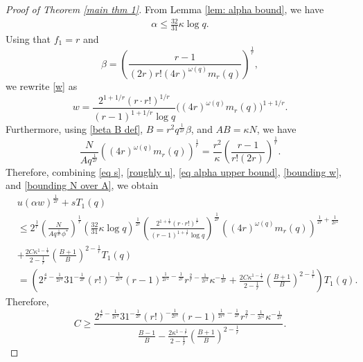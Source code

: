 \documentclass[12pt]{amsart}
\theoremstyle{plain}
\theoremstyle{definition}
\begin{document}
\begin{proof}[Proof of Theorem \ref{main thm 1}]
From Lemma \ref{lem: alpha bound}, we have
\begin{align}\label{eq alpha upper bound}
\alpha \le \frac{32}{31}\kappa \log{q}.    
\end{align}
Using that $f_1 = r$ and \begin{equation}\label{beta B def}\beta = \left(\frac{r-1}{(2r)r!(4r)^{\omega(q)}m_r(q)}\right)^{\frac{1}{r}},
\end{equation}
we rewrite \eqref{w} as
\begin{equation}\label{bounding w}
    w = \frac{2^{1+1/r}(r\cdot r!)^{1/r}}{(r-1)^{1+1/r}\log q} \bigl(\left(4r\right)^{\omega(q)}m_r(q)\bigr)^{1+1/r}.
\end{equation}
Furthermore, using \eqref{beta B def}, $B = r^2q^{\frac{1}{2r}}\beta$, and $AB = \kappa N$, we have
\begin{equation}\label{bounding N over A}
\frac{N}{A q^{\frac{1}{2r}}}\left((4r)^{\omega(q)}m_r(q)\right)^{\frac{1}{r}} = \frac{r^2}{\kappa}\left(\frac{r-1}{r!(2r)}\right)^{\frac{1}{r}}.
\end{equation}
Therefore, combining \eqref{eq s}, \eqref{roughly u}, \eqref{eq alpha upper bound}, \eqref{bounding w}, and \eqref{bounding N over A},  we obtain
\begin{align*}
    &u(\alpha w)^{\frac{1}{2r}}+sT_1(q)\\ 
    &\le 2^{\frac{1}{r}}\left(\frac{N}{Aq^{\frac{1}{2r}}\phi^*}\right)^{\frac{1}{r}}\left(\frac{32}{31}\kappa \log{q}\right)^{\frac{1}{2r}}\left(\frac{2^{1+\frac{1}{r}}(r\cdot r!)^{\frac{1}{r}}}{(r-1)^{1+\frac{1}{r}}\log{q}}\right)^{\frac{1}{2r}}\left((4r)^{\omega(q)}m_r(q)\right)^{\frac{1}{2r}+\frac{1}{2r^2}}\\ &+\frac{2C\kappa^{1-\frac{1}{r}}}{2-\frac{1}{r}}\left(\frac{B+1}{B}\right)^{2-\frac{1}{r}}T_1(q)\\
    &= \left(2^{\frac{4}{r}-\frac{1}{2r^2}}31^{-\frac{1}{2r}}(r!)^{-\frac{1}{2r^2}}(r-1)^{\frac{1}{2r^2}-\frac{1}{2r}}r^{\frac{2}{r}-\frac{1}{2r^2}}\kappa^{-\frac{1}{2r}} +\frac{2C\kappa^{1-\frac{1}{r}}}{2-\frac{1}{r}}\left(\frac{B+1}{B}\right)^{2-\frac{1}{r}}\right)T_1(q).
\end{align*}
Therefore,
\begin{equation} \label{C lower bound}
C \ge \frac{2^{\frac{4}{r}-\frac{1}{2r^2}}31^{-\frac{1}{2r}}(r!)^{-\frac{1}{2r^2}}(r-1)^{\frac{1}{2r^2}-\frac{1}{2r}}r^{\frac{2}{r}-\frac{1}{2r^2}}\kappa^{-\frac{1}{2r}}}{\frac{B-1}{B}-\frac{2\kappa^{1-\frac{1}{r}}}{2-\frac{1}{r}}\left(\frac{B+1}{B}\right)^{2-\frac{1}{r}}}.
\end{equation}


\end{proof}
\end{document}
